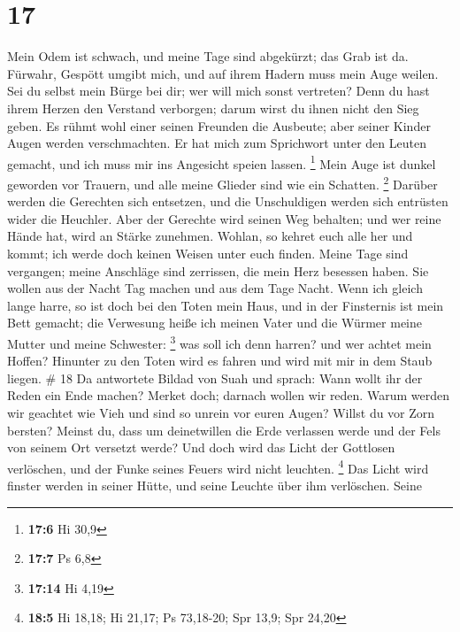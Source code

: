 \hypertarget{section-4}{%
\section{17}\label{section-4}}

 Mein Odem ist schwach, und meine Tage sind abgekürzt; das
Grab ist da.  Fürwahr, Gespött umgibt mich, und auf ihrem
Hadern muss mein Auge weilen.  Sei du selbst mein Bürge bei
dir; wer will mich sonst vertreten?  Denn du hast ihrem
Herzen den Verstand verborgen; darum wirst du ihnen nicht den Sieg
geben.  Es rühmt wohl einer seinen Freunden die Ausbeute;
aber seiner Kinder Augen werden verschmachten.  Er hat mich
zum Sprichwort unter den Leuten gemacht, und ich muss mir ins Angesicht
speien lassen. \footnote{\textbf{17:6} Hi 30,9}  Mein Auge
ist dunkel geworden vor Trauern, und alle meine Glieder sind wie ein
Schatten. \footnote{\textbf{17:7} Ps 6,8}  Darüber werden
die Gerechten sich entsetzen, und die Unschuldigen werden sich entrüsten
wider die Heuchler.  Aber der Gerechte wird seinen Weg
behalten; und wer reine Hände hat, wird an Stärke zunehmen.
 Wohlan, so kehret euch alle her und kommt; ich werde doch
keinen Weisen unter euch finden.  Meine Tage sind
vergangen; meine Anschläge sind zerrissen, die mein Herz besessen haben.
 Sie wollen aus der Nacht Tag machen und aus dem Tage
Nacht.  Wenn ich gleich lange harre, so ist doch bei den
Toten mein Haus, und in der Finsternis ist mein Bett gemacht;
 die Verwesung heiße ich meinen Vater und die Würmer meine
Mutter und meine Schwester: \footnote{\textbf{17:14} Hi 4,19}
 was soll ich denn harren? und wer achtet mein Hoffen?
 Hinunter zu den Toten wird es fahren und wird mit mir in
dem Staub liegen. \# 18  Da antwortete Bildad von Suah und
sprach:  Wann wollt ihr der Reden ein Ende machen? Merket
doch; darnach wollen wir reden.  Warum werden wir geachtet
wie Vieh und sind so unrein vor euren Augen?  Willst du vor
Zorn bersten? Meinst du, dass um deinetwillen die Erde verlassen werde
und der Fels von seinem Ort versetzt werde?  Und doch wird
das Licht der Gottlosen verlöschen, und der Funke seines Feuers wird
nicht leuchten. \footnote{\textbf{18:5} Hi 18,18; Hi 21,17; Ps 73,18-20;
  Spr 13,9; Spr 24,20}  Das Licht wird finster werden in
seiner Hütte, und seine Leuchte über ihm verlöschen.  Seine
